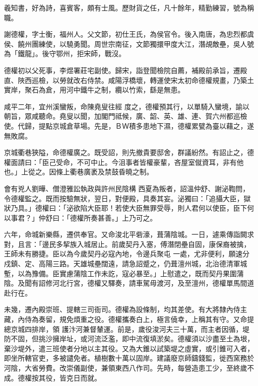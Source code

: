 \begin{pinyinscope}
 羲知書，好為詩，喜賓客，頗有士風。歷財貨之任，凡十餘年，精勤練習，號為稱職。



 謝德權，字士衡，福州人。父文節，初仕王氏，為侯官令。後入南唐，為忠烈都虞侯、饒州團練使，以驍勇聞。周世宗南征，文節獨擐甲度大江，潛覘敵壘，吳人號為「鐵龍」。後守鄂州，拒宋師，戰沒。



 德權初以父死事，李煜署莊宅副使。歸宋，詣登聞檢院自薦，補殿前承旨，遷殿直、陜西巡檢，以勞就改右侍禁。咸陽浮橋壞，轉運使宋太初命德權規畫，乃築土實岸，聚石為倉，用河中鐵牛之制，纜以竹索，繇是無患。



 咸平二年，宜州溪蠻叛，命陳堯叟往經
 度之，德權預其行，以單騎入蠻境，諭以朝旨，眾咸聽命。堯叟以聞，加閣門祗候，廣、韶、英、雄、連、賀六州都巡檢使。代歸，提點京城倉草場。先是，ＢＷ積多患地下濕，德權累甓為臺以藉之，遂無敗腐。



 京城衢巷狹隘，命德權廣之。既受詔，則先撤貴要邸舍，群議紛然。有詔止之，德權面請曰：「臣己受命，不可中止。今沮事者皆權豪輩，吝屋室僦資耳，非有他也。」上從之。因條上衢巷廣袤及禁鼓昏曉之制。



 會有兇人劉曄、僧澄雅訟執政與許州民陰構
 西夏為叛者，詔溫仲舒、謝泌鞫問，令德權監之。既而按驗無狀，翌日，對便殿，具奏其妄。泌獨曰：「追攝大臣，獄狀乃具。」德權曰：「泌欲陷大臣耶！若使大臣無罪受辱，則人君何以使臣，臣下何以事君？」仲舒曰：「德權所奏甚善。」上乃可之。



 六年，命城新樂縣，遷供奉官。又命浚北平砦濠，葺蒲陰城。一日，遽乘傳詣闕求對，且言：「邊民多挈族入城居止。前歲契丹入塞，傅潛閉壘自固，康保裔被擒，王師未有勝捷。臣以為今歲契丹必寇內地，令邊兵聚屯
 一處，尤非便利，願速分戍鎮、定、高陽三路。天雄城壘闊遠，請急詔蹙之，仍葺澶州城，北治德清軍城塹，以為豫備。臣實慮蒲陰工作未訖，寇必暴至。」上慰遣之，既而契丹果圍蒲陰。及聞有詔修河北行宮，德權又驛奏，請車駕毋渡河，及至澶州，德權單馬間道赴行在。



 未幾，遷內殿崇班、提轄三司衙司。德權為設條制，均其差使。有大將隸內侍主藏，內侍為奏留，規免煩重之役。德權攜奏白上，極言僥幸，上稱其有守。又命提總京城四排岸，領
 護汴河兼督輦運。前是，歲役浚河夫三十萬，而主者因循，堤防不固，但挑沙擁岸址，或河流泛濫，即中流復填淤矣。德權須以沙盡至土為垠，棄沙堤外，遣三班使者分地以主其役。又為大錐以試築堤之虛實，或引錐可入者，即坐所轄官吏，多被譴免者。植樹數十萬以固岸。建議廢京師鑄錢監，徙西窯務於河陰，大省勞費。改崇儀副使，兼領東西八作司。先時，每營造患工少，至終歲不成。德權按其役，皆克日而就。




\end{pinyinscope}
